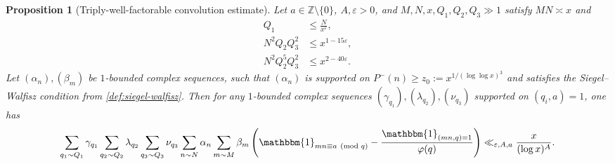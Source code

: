 \documentclass[reqno,11pt]{amsart}
\newtheorem{proposition}[theorem]{Proposition}
\theoremstyle{remark}
\numberwithin{equation}{section}
\newcommand{\Z}{\mathbb{Z}}
\newcommand{\one}{\mathbbm{1}}
\newcommand{\eps}{\varepsilon}
\renewcommand{\pmod}[1]{\ (\textnormal{mod } #1)}
\begin{document}
\begin{proposition}[Triply-well-factorable convolution estimate] \label{prop:well-fact-convolution}
Let $a \in \Z \setminus \{0\}$, $A, \eps > 0$, and $M, N, x, Q_1, Q_2, Q_3 \gg 1$ satisfy $MN \asymp x$ and
\begin{equation} \label{eq:ranges-q1q2q3-revisited}
\begin{aligned}
    Q_1 &\le \frac{N}{x^\eps}, 
    \\
    N^2 Q_2 Q_3^2 &\le x^{1-15\eps},
    \\ 
    N^2 Q_2^5 Q_3^{2} &\le 
    x^{2-40\eps}.
\end{aligned}
\end{equation}
Let $(\alpha_n), (\beta_m)$ be $1$-bounded complex sequences, such that $(\alpha_n)$ is supported on $P^-(n) \ge z_0 := x^{1/(\log\log x)^3}$ and satisfies the Siegel--Walfisz condition from \cref{def:siegel-walfisz}. Then for any $1$-bounded complex sequences $(\gamma_{q_1}), (\lambda_{q_2}), (\nu_{q_3})$ supported on $(q_i, a) = 1$, one has
\[
    \sum_{q_1 \sim Q_1} \gamma_{q_1} \sum_{q_2 \sim Q_2} \lambda_{q_2} \sum_{q_3 \sim Q_3} \nu_{q_3} \sum_{n \sim N} \alpha_n \sum_{m \sim M} \beta_m \left(\one_{mn \equiv a \pmod{q}} - \frac{\one_{(mn, q) = 1}}{\varphi(q)}\right)
    \ll_{\eps,A,a} 
    \frac{x}{(\log x)^A}.
\]
\end{proposition}
\end{document}
